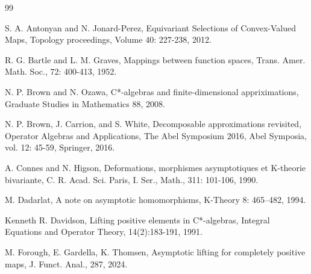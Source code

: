 \documentclass{article}%
\begin{document}
\begin{thebibliography}{99}

S. A. Antonyan and N.  Jonard-Perez, Equivariant Selections of
Convex-Valued Maps, Topology proceedings, Volume 40:  227-238,  2012.


 R. G. Bartle and L. M. Graves, Mappings between function spaces, Trans. Amer. Math. Soc., 72:
400-413, 1952.

 N. P. Brown and N. Ozawa, C*-algebras and finite-dimensional appriximations, Graduate Studies in Mathematics 88, 2008.


 N. P. Brown, J. Carrion, and S. White, Decomposable approximations revisited,
Operator Algebras and Applications, The Abel Symposium 2016, Abel Symposia, vol. 12: 45-59,
Springer,  2016.


A. Connes and N. Higson, Deformations, morphismes asymptotiques et K-theorie bivariante, C. R.
Acad. Sci. Paris, I. Ser., Math., 311: 101-106, 1990.

M. Dadarlat, A note on asymptotic homomorphisms, K-Theory 8: 465--482,  1994.



Kenneth R. Davidson, Lifting positive elements in C*-algebras,  Integral Equations and  Operator Theory,
14(2):183-191, 1991.

M. Forough, E. Gardella, K. Thomsen, Asymptotic lifting for completely positive maps, J. Funct. Anal., 287, 2024.







\end{thebibliography}
\end{document}
